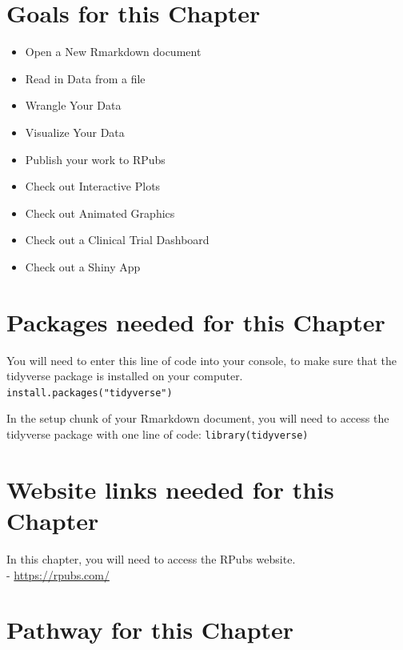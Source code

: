 \documentclass[]{book}
\providecommand{\tightlist}{%
  \setlength{\itemsep}{0pt}\setlength{\parskip}{0pt}}
\begin{document}
\hypertarget{goals-for-this-chapter-1}{%
\section{Goals for this Chapter}\label{goals-for-this-chapter-1}}

\begin{itemize}
\tightlist
\item
  Open a New Rmarkdown document
\item
  Read in Data from a file
\item
  Wrangle Your Data
\item
  Visualize Your Data
\item
  Publish your work to RPubs
\item
  Check out Interactive Plots
\item
  Check out Animated Graphics
\item
  Check out a Clinical Trial Dashboard
\item
  Check out a Shiny App
\end{itemize}

\hypertarget{packages-needed-for-this-chapter}{%
\section{Packages needed for this Chapter}\label{packages-needed-for-this-chapter}}

You will need to enter this line of code into your console, to make sure that the tidyverse package is installed on your computer.
\texttt{install.packages("tidyverse")}

In the setup chunk of your Rmarkdown document, you will need to access the tidyverse package with one line of code:
\texttt{library(tidyverse)}

\hypertarget{website-links-needed-for-this-chapter-1}{%
\section{Website links needed for this Chapter}\label{website-links-needed-for-this-chapter-1}}

In this chapter, you will need to access the RPubs website.\\
- \url{https://rpubs.com/}

\hypertarget{pathway-for-this-chapter-1}{%
\section{Pathway for this Chapter}\label{pathway-for-this-chapter-1}}
\end{document}
